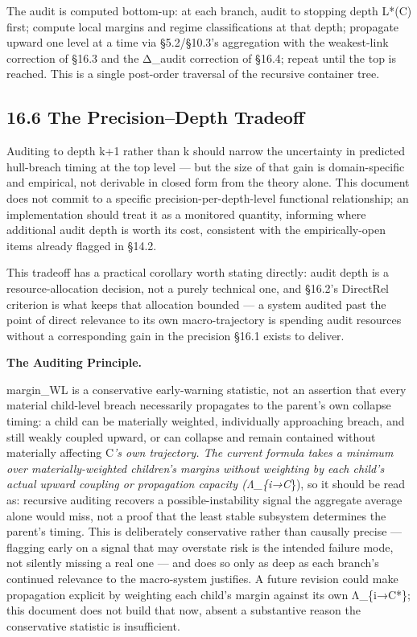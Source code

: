\documentclass[
]{article}
\begin{document}
The audit is computed bottom-up: at each branch, audit to stopping depth
L*(C) first; compute local margins and regime classifications at that
depth; propagate upward one level at a time via §5.2/§10.3's aggregation
with the weakest-link correction of §16.3 and the Δ\_audit correction of
§16.4; repeat until the top is reached. This is a single post-order
traversal of the recursive container tree.

\hypertarget{the-precisiondepth-tradeoff}{%
\subsection{16.6 The Precision--Depth
Tradeoff}\label{the-precisiondepth-tradeoff}}

Auditing to depth k+1 rather than k should narrow the uncertainty in
predicted hull-breach timing at the top level --- but the size of that
gain is domain-specific and empirical, not derivable in closed form from
the theory alone. This document does not commit to a specific
precision-per-depth-level functional relationship; an implementation
should treat it as a monitored quantity, informing where additional
audit depth is worth its cost, consistent with the empirically-open
items already flagged in §14.2.

This tradeoff has a practical corollary worth stating directly: audit
depth is a resource-allocation decision, not a purely technical one, and
§16.2's DirectRel criterion is what keeps that allocation bounded --- a
system audited past the point of direct relevance to its own
macro-trajectory is spending audit resources without a corresponding
gain in the precision §16.1 exists to deliver.

\textbf{The Auditing Principle.}

margin\_WL is a conservative early-warning statistic, not an assertion
that every material child-level breach necessarily propagates to the
parent's own collapse timing: a child can be materially weighted,
individually approaching breach, and still weakly coupled upward, or can
collapse and remain contained without materially affecting C\emph{'s own
trajectory. The current formula takes a minimum over materially-weighted
children's margins without weighting by each child's actual upward
coupling or propagation capacity (Λ\_\{i→C}\}), so it should be read as:
recursive auditing recovers a possible-instability signal the aggregate
average alone would miss, not a proof that the least stable subsystem
determines the parent's timing. This is deliberately conservative rather
than causally precise --- flagging early on a signal that may overstate
risk is the intended failure mode, not silently missing a real one ---
and does so only as deep as each branch's continued relevance to the
macro-system justifies. A future revision could make propagation
explicit by weighting each child's margin against its own Λ\_\{i→C*\};
this document does not build that now, absent a substantive reason the
conservative statistic is insufficient.
\end{document}
